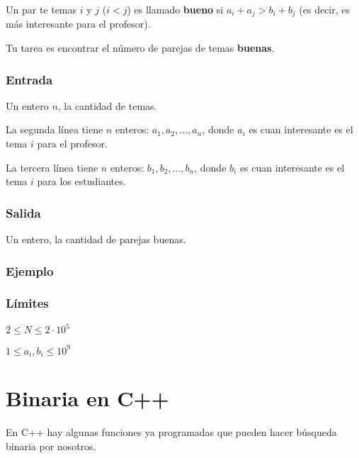 Un par te temas \(i\) y \(j\) (\(i<j\)) es llamado \textbf{bueno} si \(a_i+a_j > b_i+b_j\) (es decir, es más interesante para el profesor).

Tu tarea es encontrar el número de parejas de temas \textbf{buenas}.
\subsubsection*{Entrada}
Un entero \(n\), la cantidad de temas.

La segunda línea tiene \(n\) enteros: \(a_1,a_2,\ldots, a_n\), donde \(a_i\) es cuan interesante es el tema \(i\) para el profesor.

La tercera línea tiene \(n\) enteros: \(b_1,b_2,\ldots, b_n\), donde \(b_i\) es cuan interesante es el tema \(i\) para los estudiantes.

\subsubsection*{Salida}
Un entero, la cantidad de parejas buenas.

\subsubsection*{Ejemplo}
\begin{casebox2}
\end{casebox2}

\subsubsection*{Límites}
\begin{plimits}
	\item \(2\leq N\leq 2\cdot 10^5\)
	\item \(1\leq a_i, b_i\leq  10^9\)
\end{plimits}
\codeforces


\problembreak
\newpage
\section*{Binaria en C++}
En C++ hay algunas funciones ya programadas que pueden hacer búsqueda binaria por nosotros.

